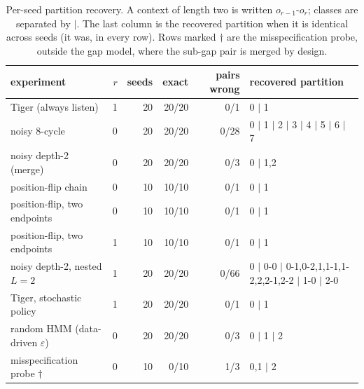 \documentclass{article}
\newcommand{\eps}{\varepsilon}
\begin{document}
\begin{table}[t]
  \centering
  \caption{Per-seed partition recovery.  A context of length two is written
  $o_{r-1}\text{-}o_r$; classes are separated by $\mid$.  The last column is
  the recovered partition when it is identical across seeds (it was, in every
  row).  Rows marked $\dagger$ are the misspecification probe, outside the
  gap model, where the sub-gap pair is merged by design.}
  \label{tab:partitions}
  \footnotesize
  \begin{tabular}{lrrrrp{5.2cm}}
    \toprule
    experiment & $r$ & seeds & exact & pairs wrong & recovered partition\\
    \midrule
    Tiger (always listen) & 1 & 20 & 20/20 & 0/1 & 0 $\mid$ 1\\
    noisy 8-cycle & 0 & 20 & 20/20 & 0/28 & 0 $\mid$ 1 $\mid$ 2 $\mid$ 3 $\mid$ 4 $\mid$ 5 $\mid$ 6 $\mid$ 7\\
    noisy depth-2 (merge) & 0 & 20 & 20/20 & 0/3 & 0 $\mid$ 1,2\\
    position-flip chain & 0 & 10 & 10/10 & 0/1 & 0 $\mid$ 1\\
    position-flip, two endpoints & 0 & 10 & 10/10 & 0/1 & 0 $\mid$ 1\\
    position-flip, two endpoints & 1 & 10 & 10/10 & 0/1 & 0 $\mid$ 1\\
    noisy depth-2, nested $L=2$ & 1 & 20 & 20/20 & 0/66 & 0 $\mid$ 0-0 $\mid$ 0-1,0-2,1,1-1,1-2,2,2-1,2-2 $\mid$ 1-0 $\mid$ 2-0\\
    Tiger, stochastic policy & 1 & 20 & 20/20 & 0/1 & 0 $\mid$ 1\\
    random HMM (data-driven $\eps$) & 0 & 20 & 20/20 & 0/3 & 0 $\mid$ 1 $\mid$ 2\\
    misspecification probe $\dagger$ & 0 & 10 & 0/10 & 1/3 & 0,1 $\mid$ 2\\
    \bottomrule
  \end{tabular}
\end{table}


\end{document}
